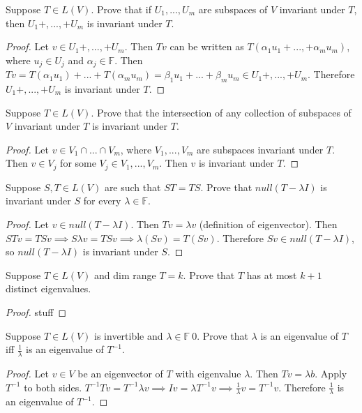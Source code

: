 \documentclass[a4paper]{article}
\begin{document}
\begin{description}
	\item Suppose $T\in L(V)$. Prove that if $U_{1},...,U_{m}$ are subspaces of $V$ invariant under $T$, then $U_{1}+,...,+U_{m}$ is invariant under $T$. 
		\begin{proof}
		Let $v\in U_{1}+,...,+U_{m}$. Then $Tv$ can be written as $T(\alpha_{1} u_{1}+...,+\alpha_{m} u_{m})$, where $u_{j} \in U_{j}$ and $\alpha_{j} \in \mathbb{F}$. Then $Tv = T(\alpha_{1} u_{1}) +...+ T(\alpha_{m} u_{m})= \beta_{1} u_{1} + ... + \beta_{m} u_{m} \in  U_{1}+,...,+U_{m}$. Therefore $U_{1}+,...,+U_{m}$ is invariant under $T$.
		\end{proof}

	\item Suppose $T \in L(V) $. Prove that the intersection of any collection of subspaces of $V$ invariant under $T$ is invariant under $T$.
		\begin{proof}
		 Let $v \in V_{1} \cap ... \cap V_{m} $, where  $V_{1}, ..., V_{m}$ are subspaces invariant under $T$. Then $v \in V_{j}$ for some $ V_{j}\in V_{1}, ..., V_{m}$. Then $v$ is invariant under $T$. 
			
		\end{proof}
	\item Suppose $S,T \in L(V)$ are such that $ST = TS$. Prove that $null(T- \lambda I)$ is invariant under $S$ for every $\lambda \in \mathbb{F}$.
		\begin{proof}
		Let $v \in null(T- \lambda I)$. Then $ Tv = \lambda v$ (definition of eigenvector). Then $STv = TSv \implies S\lambda v = TSv \implies \lambda (Sv) = T(Sv)$. Therefore $Sv \in null(T- \lambda I)$, so $null(T- \lambda I)$  	 is invariant under $S$.
			
		\end{proof}
	
	\item Suppose $ T \in L(V)$ and dim range $T = k$. Prove that $T$ has at most $ k + 1 $ distinct eigenvalues.
	\begin{proof}
		stuff
		
	\end{proof}
	\item Suppose $T \in L(V) $ is invertible and $ \lambda \in \mathbb{F} \ {0}$. Prove that $\lambda$ is an eigenvalue of $T$ iff $ \frac{1}{\lambda} $ is an eigenvalue of $T^{-1}$.
		\begin{proof}
			Let $v \in V$ be an eigenvector of $T$ with eigenvalue $\lambda$. Then $ Tv = \lambda b $. Apply $T^{-1}$ to both sides. $ T^{-1} Tv = T^{-1} \lambda v \implies Iv = \lambda T^{-1} v \implies \frac{1}{\lambda} v = T^{-1} v$. Therefore $ \frac{1}{\lambda} $ is an eigenvalue of $ T^{-1} $.
		\end{proof}
			

\end{description}	
\end{document}
